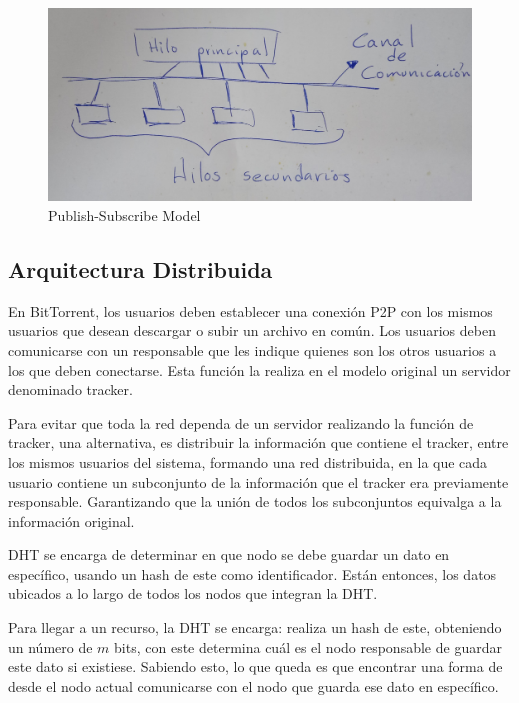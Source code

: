 \documentclass{article}
\begin{document}
\begin{figure}[h!]
    \centering
    \includegraphics[width=\textwidth]{./images/publish_subscribe.jpg}
    \caption{Publish-Subscribe Model}
    \label{fig:publish_subscribe}
\end{figure}

\subsection{Arquitectura Distribuida}

En BitTorrent, los usuarios deben establecer una conexión P2P con los mismos usuarios que desean descargar o subir un archivo en común. Los usuarios deben comunicarse con un responsable que les indique quienes son los otros usuarios a los que deben conectarse. Esta función la realiza en el modelo original un servidor denominado tracker.

Para evitar que toda la red dependa de un servidor realizando la función de tracker, una alternativa, es distribuir la información que contiene el tracker, entre los mismos usuarios del sistema, formando una red distribuida, en la que cada usuario contiene un subconjunto de la información que el tracker era previamente responsable. Garantizando que la unión de todos los subconjuntos equivalga a la información original.

DHT se encarga de determinar en que nodo se debe guardar un dato en específico, usando un hash de este como identificador. Están entonces, los datos ubicados a lo largo de todos los nodos que integran la DHT.

Para llegar a un recurso, la DHT se encarga: realiza un hash de este, obteniendo un número de $m$ bits, con este determina cuál es el nodo responsable de guardar este dato si existiese. Sabiendo esto, lo que queda es que encontrar una forma de desde el nodo actual comunicarse con el nodo que guarda ese dato en específico.
\end{document}
